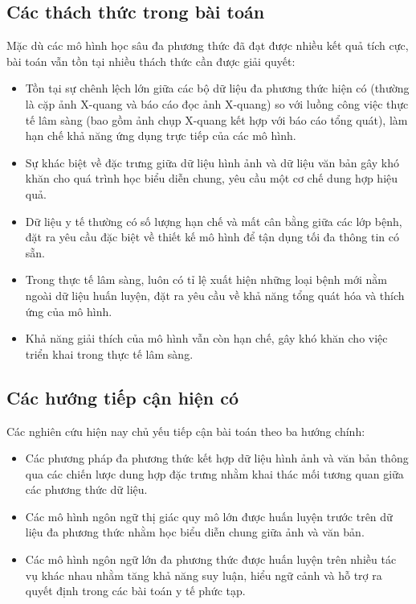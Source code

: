 
\subsection{Các thách thức trong bài toán}

Mặc dù các mô hình học sâu đa phương thức đã đạt được nhiều kết quả tích cực, bài toán vẫn tồn tại nhiều thách thức cần được giải quyết:

\begin{itemize}
    \item Tồn tại sự chênh lệch lớn giữa các bộ dữ liệu đa phương thức hiện có (thường là cặp ảnh X-quang và báo cáo đọc ảnh X-quang) so với luồng công việc thực tế lâm sàng (bao gồm ảnh chụp X-quang kết hợp với báo cáo tổng quát), làm hạn chế khả năng ứng dụng trực tiếp của các mô hình.
    \item Sự khác biệt về đặc trưng giữa dữ liệu hình ảnh và dữ liệu văn bản gây khó khăn cho quá trình học biểu diễn chung, yêu cầu một cơ chế dung hợp hiệu quả.
    \item Dữ liệu y tế thường có số lượng hạn chế và mất cân bằng giữa các lớp bệnh, đặt ra yêu cầu đặc biệt về thiết kế mô hình để tận dụng tối đa thông tin có sẵn.
    \item Trong thực tế lâm sàng, luôn có tỉ lệ xuất hiện những loại bệnh mới nằm ngoài dữ liệu huấn luyện, đặt ra yêu cầu về khả năng tổng quát hóa và thích ứng của mô hình.
    \item Khả năng giải thích của mô hình vẫn còn hạn chế, gây khó khăn cho việc triển khai trong thực tế lâm sàng.
\end{itemize}

\subsection{Các hướng tiếp cận hiện có}
Các nghiên cứu hiện nay chủ yếu tiếp cận bài toán theo ba hướng chính:

\begin{itemize}
    \item Các phương pháp đa phương thức kết hợp dữ liệu hình ảnh và văn bản thông qua các chiến lược dung hợp đặc trưng nhằm khai thác mối tương quan giữa các phương thức dữ liệu.
    \item Các mô hình ngôn ngữ thị giác quy mô lớn được huấn luyện trước trên dữ liệu đa phương thức nhằm học biểu diễn chung giữa ảnh và văn bản.
    \item Các mô hình ngôn ngữ lớn đa phương thức được huấn luyện trên nhiều tác vụ khác nhau nhằm tăng khả năng suy luận, hiểu ngữ cảnh và hỗ trợ ra quyết định trong các bài toán y tế phức tạp.
\end{itemize}

